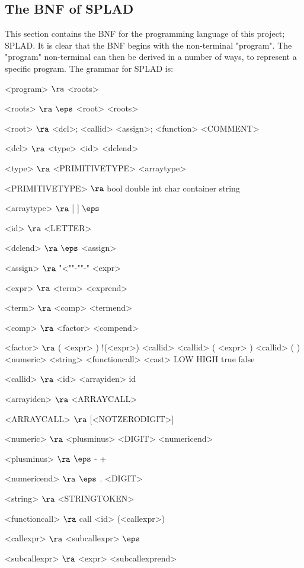 \subsection{The BNF of SPLAD}
This section contains the BNF for the programming language of this project; SPLAD. It is clear that the BNF begins with the non-terminal "program". The "program" non-terminal can then be derived in a number of ways, to represent a specific program. The grammar for SPLAD is:

\begin{grammar}
<program> $\ra$ <roots>

<roots> $\ra$ $\eps$
\alt <root> <roots>
 
<root> $\ra$ <dcl>;
\alt <callid> <assign>;
\alt <function>
\alt <COMMENT>

<dcl> $\ra$ <type> <id> <dclend>

<type> $\ra$ <PRIMITIVETYPE> <arraytype>

<PRIMITIVETYPE> $\ra$ bool
\alt double
\alt int
\alt char
\alt container
\alt string

<arraytype> $\ra$ [ ]
\alt$\eps$

<id> $\ra$ <LETTER>

<dclend> $\ra$ $\eps$
\alt <assign> 

<assign> $\ra$ "<""-""-" <expr>

<expr> $\ra$ <term> <exprend>

<term> $\ra$ <comp> <termend>

<comp> $\ra$ <factor> <compend>

<factor> $\ra$ ( <expr> )
	\alt !(<expr>)
	\alt <callid>
	\alt <callid> ( <expr> )
	\alt <callid> ( )
	\alt <numeric>
	\alt <string>
	\alt <functioncall> 
	\alt <cast>
	\alt LOW
	\alt HIGH
	\alt true
	\alt false

<callid> $\ra$ <id> <arrayiden>
\alt id

<arrayiden> $\ra$ <ARRAYCALL>

<ARRAYCALL> $\ra$ [<NOTZERODIGIT>]

<numeric> $\ra$ <plusminus> <DIGIT> <numericend>

<plusminus> $\ra$ $\eps$
	\alt -
	\alt +

<numericend> $\ra$ $\eps$
\alt . <DIGIT>

<string> $\ra$ <STRINGTOKEN>

<functioncall> $\ra$ call <id> (<callexpr>)

<callexpr> $\ra$ <subcallexpr>
\alt$\eps$

<subcallexpr> $\ra$ <expr> <subcallexprend>


\end{grammar}
